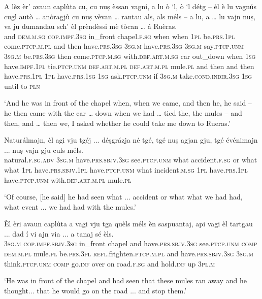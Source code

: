 \begin{linenumbers}
\gll   A lèz èr’ avaun caplùta cu, cu nuṣ èssan vagní, a lu ò `l, ò `l détg – èl è lu vagnús cugl autò … anòragjù cu nuṣ vèvan … rantau als, als méls – a lu, a … lu vajn nuṣ, va ju dumandau sch’ èl prèndèssi mè tòcan … á Ruèras. \\
and \textsc{dem.m.sg} \textsc{cop.impf.3sg} in\_front  chapel.\textsc{f.sg} when when \textsc{1pl} be.\textsc{prs.1pl}  come.\textsc{ptcp.m.pl} and then have.\textsc{prs.3sg} \textsc{3sg.m} have.\textsc{prs.3sg} \textsc{3sg.m} say.\textsc{ptcp.unm} {} \textsc{3sg.m}  be.\textsc{prs.3sg} then come.\textsc{ptcp.m.sg} with.\textsc{def.art.m.sg} car {} out\_down when \textsc{1sg} have.\textsc{impf.1pl} {} tie.\textsc{ptcp.unm} \textsc{def.art.m.pl} \textsc{def.art.m.pl} mule.\textsc{pl} {} and then and {} then have.\textsc{prs.1pl} \textsc{1pl} have.\textsc{prs.1sg}  \textsc{1sg} ask.\textsc{ptcp.unm} if \textsc{3sg.m} take.\textsc{cond.indir.3sg} \textsc{1sg} until {} to  \textsc{pln}\\
\end{linenumbers}
\medskip
\glt `And he was in front of the chapel when, when we came, and then he, he said – he then came with the car … down when we had … tied the, the mules – and then, and … then we, I asked whether he could take me down to Rueras.'
\medskip

\begin{linenumbers}
\gll Naturálmajn, èl agi vju tgéj ... déṣgrázja né tgé, tgé nuṣ agjan gju, tgé événimajn ... nuṣ vajn gju culs méls.\\
natural.\textsc{f.sg.adv} \textsc{3sg.m} have.\textsc{prs.sbjv.3sg} see.\textsc{ptcp.unm} what accident.\textsc{f.sg} {} or what what \textsc{1pl} have.\textsc{prs.sbjv.1pl} have.\textsc{ptcp.unm} what incident.\textsc{m.sg} {} \textsc{1pl} have.\textsc{prs.1pl} have.\textsc{ptcp.unm} with.\textsc{def.art.m.pl} mule.\textsc{pl} \\
\end{linenumbers}
\medskip
\glt `Of course, [he said] he had seen what ... accident or what what we had had, what event ... we had had with the mules.' 
\medskip

\begin{linenumbers}
\gll  Èl èri avaun caplùta a vagi vju tga quèls méls èn saspuantaj, api vagi èl tartgau ... dad í vi ajn via ... a tanaj sé èls.  \\
 \textsc{3sg.m} \textsc{cop.impf.sbjv.3sg} in\_front chapel and have.\textsc{prs.sbjv.3sg} see.\textsc{ptcp.unm} \textsc{comp} \textsc{dem.m.pl} mule.\textsc{pl} be.\textsc{prs.3pl} \textsc{refl.}frighten.\textsc{ptcp.m.pl} and have.\textsc{prs.sbjv.3sg} \textsc{3sg.m} think.\textsc{ptcp.unm} {} \textsc{comp} go.\textsc{inf} over on road.\textsc{f.sg} {} and hold.\textsc{inf} up \textsc{3pl.m}\\
\end{linenumbers}
\medskip
\glt `He was in front of the chapel and had seen that these mules ran away and he thought... that he would go on the road ... and stop them.'
\medskip

